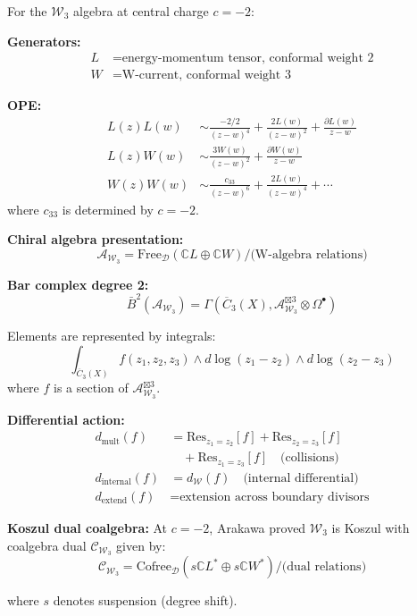 \begin{example}[Explicit: $\mathcal{W}_3$ at $c = -2$]\label{ex:w3-c-minus-2-explicit}
For the $\mathcal{W}_3$ algebra at central charge $c = -2$:

\textbf{Generators:}
\begin{align*}
L &= \text{energy-momentum tensor, conformal weight 2} \\
W &= \text{W-current, conformal weight 3}
\end{align*}

\textbf{OPE:}
\begin{align*}
L(z)L(w) &\sim \frac{-2/2}{(z-w)^4} + \frac{2L(w)}{(z-w)^2} + \frac{\partial L(w)}{z-w} \\
L(z)W(w) &\sim \frac{3W(w)}{(z-w)^2} + \frac{\partial W(w)}{z-w} \\
W(z)W(w) &\sim \frac{c_{33}}{(z-w)^6} + \frac{2L(w)}{(z-w)^4} + \cdots
\end{align*}
where $c_{33}$ is determined by $c = -2$.

\textbf{Chiral algebra presentation:}
$$\mathcal{A}_{\mathcal{W}_3} = \text{Free}_{\mathcal{D}}(\mathbb{C}L \oplus \mathbb{C}W) 
/ \text{(W-algebra relations)}$$

\textbf{Bar complex degree 2:}
$$\bar{B}^2(\mathcal{A}_{\mathcal{W}_3}) = \Gamma\left(\overline{C}_3(X), 
\mathcal{A}_{\mathcal{W}_3}^{\boxtimes 3} \otimes \Omega^\bullet\right)$$

Elements are represented by integrals:
$$\int_{\overline{C}_3(X)} f(z_1, z_2, z_3) \wedge d\log(z_1-z_2) \wedge d\log(z_2-z_3)$$
where $f$ is a section of $\mathcal{A}_{\mathcal{W}_3}^{\boxtimes 3}$.

\textbf{Differential action:}
\begin{align*}
d_{\text{mult}}(f) &= \text{Res}_{z_1 = z_2}[f] + \text{Res}_{z_2 = z_3}[f] \\
&\quad + \text{Res}_{z_1 = z_3}[f] \quad \text{(collisions)} \\
d_{\text{internal}}(f) &= d_{\mathcal{W}}(f) \quad \text{(internal differential)} \\
d_{\text{extend}}(f) &= \text{extension across boundary divisors}
\end{align*}

\textbf{Koszul dual coalgebra:} At $c = -2$, Arakawa proved $\mathcal{W}_3$ is 
Koszul with coalgebra dual $\mathcal{C}_{\mathcal{W}_3}$ given by:
$$\mathcal{C}_{\mathcal{W}_3} = \text{Cofree}_{\mathcal{D}}(s\mathbb{C}L^* \oplus s\mathbb{C}W^*) 
/ \text{(dual relations)}$$

where $s$ denotes suspension (degree shift).
\end{example}

